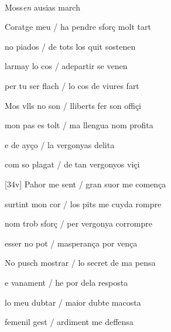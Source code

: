 \documentclass[12pt]{article}
\renewcommand{\espaiAbansEtiquetaPoema}{\vspace{0ex}}
\begin{document}
\begin{estrofa}

\espaiAbansEtiquetaPoema

\\

\begin{rubrica}

Moss\textit{en} ausias march

\end{rubrica}

\end{estrofa}


\begin{estrofa}

 Coratge meu / ha pendre sfor\c{c} molt tart

 no piados / de tots los quit sostenen

 larmay lo cos / adepartir se venen

 per tu ser flach / lo cos de viures fart

 Mos vlls no son / lliberts fer son offi\c{c}i

 mon pas es tolt / ma llengua nom profita

 e de ay\c{c}o / la vergonyas delita

 com so plagat / de tan vergonyos vi\c{c}i

\end{estrofa}



\begin{estrofa}

 [34v] Pahor me sent / gran suor me comen\c{c}a

 surtint mon cor / los pits me cuyda rompre

 nom trob sfor\c{c} / per vergonya corrompre

 esser no pot / masperan\c{c}a por ven\c{c}a

 No pusch mostrar / lo secret de ma pensa

 e vanament / he por dela resposta

 lo meu dubtar / maior dubte macosta

 femenil gest / ardiment me deffensa

\end{estrofa}
\end{document}
